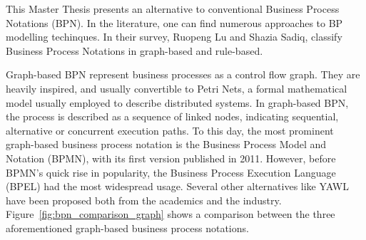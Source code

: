

This Master Thesis presents an alternative to conventional Business Process
Notations (BPN). In the literature, one can find numerous approaches to BP modelling
techinques. In their survey\cite{10.1007/978-3-540-72035-5_7}, Ruopeng Lu and
Shazia Sadiq, classify Business Process Notations in graph-based and rule-based.

Graph-based BPN represent business processes as a control flow graph. They are
heavily inspired, and usually convertible to Petri Nets\cite{lohmann2009petri},
a formal mathematical model usually employed to describe distributed systems. In
graph-based BPN, the process is described as a sequence of linked nodes,
indicating sequential, alternative or concurrent execution paths. To this day,
the most prominent graph-based business process notation is the Business Process
Model and Notation (BPMN)\cite{chinosi2012bpmn}, with its first version
published in 2011. However, before BPMN's quick rise in popularity, the Business
Process Execution Language (BPEL) had the most widespread usage. Several other
alternatives like YAWL \cite{van2005yawl} have been proposed both from the
academics and the industry. Figure~\ref{fig:bpn_comparison_graph} shows a
comparison between the three aforementioned graph-based business process
notations.


